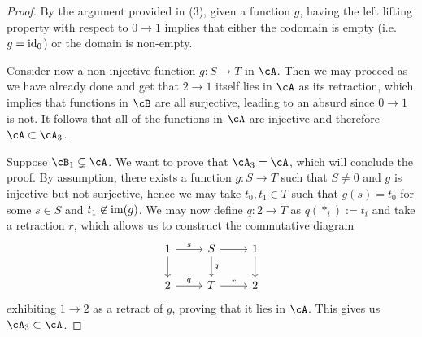\documentclass[a4paper,11pt,openany]{scrartcl}
\begin{document}
\begin{proof}
    By the argument provided in (3), given a function $g$, having the left
    lifting property with respect to $0\rightarrow 1$ implies that either the
    codomain is empty (i.e.\ $g=\operatorname{id}_0$) or the domain is non-empty.

    Consider now a non-injective function $g\colon S\rightarrow T$ in $\cA$.
    Then we may proceed as we have already done and get that $2\rightarrow 1$
    itself lies in $\cA$ as its
    retraction, which implies that functions in $\cB$ are all surjective,
    leading to an absurd since $0\rightarrow 1$ is not. It follows that all of
    the functions in $\cA$ are injective and therefore $\cA\subset\cA_3$.

    Suppose $\cB_1\subsetneq\cA$. We want to prove that $\cA_3=\cA$, which will
    conclude the proof. By assumption, there exists a function $g\colon
    S\rightarrow T$ such that $S\neq 0$ and $g$ is injective but not surjective,
    hence we may take $t_0,t_1\in T$ such that $g(s)=t_0$ for some $s\in S$ and
    $t_1\not\in\operatorname{im}(g)$. We may now define $q\colon 2\rightarrow T$ as
    $q(*_i):=t_i$ and take a retraction $r$, which allows us to construct the
    commutative diagram
    \[\begin{tikzcd}
	{1} & {S} & {1} \\
	{2} & {T} & {2}
	\arrow["{s}", from=1-1, to=1-2]
	\arrow[from=1-2, to=1-3]
	\arrow["{q}", from=2-1, to=2-2]
	\arrow["{r}", from=2-2, to=2-3]
	\arrow[from=1-1, to=2-1]
	\arrow["{g}", from=1-2, to=2-2]
	\arrow[from=1-3, to=2-3]
    \end{tikzcd}\]
    exhibiting $1\rightarrow 2$ as a retract of $g$, proving that it lies in
    $\cA$. This gives us $\cA_3\subset\cA$.
\end{proof}
\end{document}
